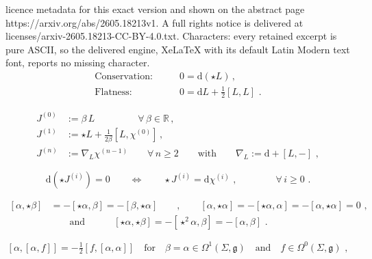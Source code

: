 \documentclass[10pt,a4paper]{amsart}
\begin{document}
licence metadata for this exact version and shown on the abstract page https://arxiv.org/abs/2605.18213v1. A full rights notice is delivered at licenses/arxiv-2605.18213-CC-BY-4.0.txt. Characters: every retained excerpt is pure ASCII, so the delivered engine, XeLaTeX with its default Latin Modern text font, reports no missing character.
\begin{equation}\label{j-properties-definition}
\begin{aligned}
\text{Conservation:}& \qquad
0=\mathrm{d}(\star L) \, ,
\\
\text{Flatness:}& \qquad 0=\mathrm{d}L+\tfrac{1}{2}[L,L] \,\, .
\end{aligned}
\end{equation}

\begin{equation}\label{original-BIZZ-tower}
\begin{aligned}
J^{(0)}&:=\beta \, L
\quad \quad \quad \quad \,\,\, \forall \, \beta \in \mathbb{R} \, ,
\\
J^{(1)}&:=\star L+\tfrac{1}{2\beta}[L,\chi^{(0)}] \, ,
\\
J^{(n)}&:=\nabla_{L}\chi^{(n-1)} \qquad \forall \, n \geq 2 \qquad \text{with} \qquad \nabla_{L}:=\mathrm{d}+[L,-] \,\, ,
\end{aligned}
\end{equation}

\begin{equation}\label{BIZZ-potentials}
\mathrm{d}(\star J^{(i)})=0 
\qquad \Longleftrightarrow \qquad
\star J^{(i)}=\mathrm{d}\chi^{(i)} \,\, , 
\qquad \qquad \forall \, i\geq 0
\,\, .
\end{equation}

\begin{equation}\label{form-commutator-star-identities}
\begin{aligned}
[\alpha,\star\beta]&=-[\star\alpha,\beta]=-[\beta,\star\alpha] 
\qquad , \qquad 
[\alpha,\star\alpha]=-[\star\alpha,\alpha]=-[\alpha,\star \alpha]=0 \,\, ,
\\
&\qquad \text{and} \quad\qquad [\star \alpha,\star \beta]=-[\star^2\alpha,\beta]=-[\alpha,\beta] \,\, .
\end{aligned}
\end{equation}

\begin{equation}\label{useful-Jacobi-1}
[\alpha,[\alpha,f]]=-\tfrac{1}{2}[f,[\alpha,\alpha]] 
\quad \text{for} \quad \beta=\alpha\in \Omega^{1}(\Sigma,\mathfrak{g})
\quad \text{and} \quad 
f\in \Omega^{0}(\Sigma,\mathfrak{g}) \,\, ,
\end{equation}
\end{document}

